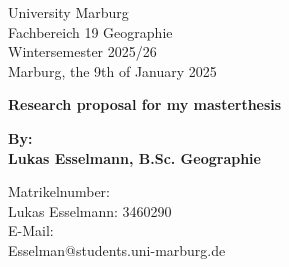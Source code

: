 \begin{titlepage}
    \begin{minipage}[t]{0.4\textwidth}
        \raggedright
        
        \large
        University Marburg\\
        Fachbereich 19 Geographie\\
        Wintersemester 2025/26\\
        Marburg, the 9th of January 2025\\
    
    \end{minipage}
    \hfill
    \begin{minipage}[t]{0.6\textwidth}
        \raggedleft
    
        \large
        
        
    \end{minipage}
    \begin{center}

        \vspace*{5cm}

        \huge
        
        \textbf{Research proposal for my masterthesis}

        \vspace{1cm}
        
        \Large
        
        \textbf{By:\\Lukas Esselmann, B.Sc. Geographie}
        
        \vspace{2.5cm}
        
    \end{center}
    \begin{minipage}[t]{0.7\textwidth}
    
        \vspace{2cm}
        
        \large
        
        Matrikelnumber:\\Lukas Esselmann: 3460290
        \vspace{0.3cm}
        \\E-Mail:\\Esselman@students.uni-marburg.de\\
        
        \vspace{0.3cm}
        
        
        
    \end{minipage}
    
\end{titlepage}